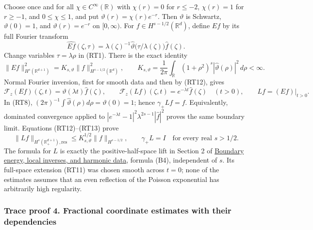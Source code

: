 \documentclass[
  11pt,
]{article}
\makeatletter
\let\ReaderOriginalAnchorStart\hyper@anchorstart
\let\ReaderOriginalAnchorEnd\hyper@anchorend
\let\ReaderPendingAliases\@empty
\def\ReaderArmAliases#1{\gdef\ReaderPendingAliases{#1}}
\def\hyper@anchorstart#1{\ReaderIfNativeAnchorTF{#1}{\ReaderPendingAliases\global\let\ReaderPendingAliases\@empty}{}\ReaderOriginalAnchorStart{#1}}
\makeatother
\begin{document}
Choose once and for all \(\chi\in C^\infty(\mathbb R)\) with
\(\chi(r)=0\) for \(r\leq-2\), \(\chi(r)=1\) for \(r\geq-1\), and
\(0\leq\chi\leq1\), and put \(\vartheta(r)=\chi(r)e^{-r}\). Then
\(\vartheta\) is Schwartz, \(\vartheta(0)=1\), and
\(\vartheta(r)=e^{-r}\) on \([0,\infty)\). For
\(f\in H^{s-1/2}(\mathbb R^d)\), define \(E f\) by its full Fourier
transform \[
 \widehat{E f}(\zeta,\tau)
 =\lambda(\zeta)^{-1}\widehat\vartheta\bigl(\tau/\lambda(\zeta)\bigr)
       \widehat f(\zeta).
 \tag{RT11}
\] Change variables \(\tau=\lambda\rho\) in (RT1). There is the exact
identity \[
 \|Ef\|_{H^s(\mathbb R^{d+1})}^2
 =K_{s,\vartheta}\|f\|_{H^{s-1/2}(\mathbb R^d)}^2,
 \qquad
 K_{s,\vartheta}=\frac1{2\pi}\int_{\mathbb R}(1+\rho^2)^s|\widehat\vartheta(\rho)|^2\,d\rho<\infty.
 \tag{RT12}
\] Normal Fourier inversion, first for smooth data and then by (RT12),
gives \[
 \mathcal F_z(Ef)(\zeta,t)=\vartheta(\lambda t)\widehat f(\zeta),
 \qquad
 \mathcal F_z(Lf)(\zeta,t)=e^{-\lambda t}\widehat f(\zeta)
 \quad(t>0),\qquad Lf=(Ef)|_{t>0}.
 \tag{RT13}
\] In (RT8),
\((2\pi)^{-1}\int\widehat\vartheta(\rho)d\rho=\vartheta(0)=1\); hence
\(\gamma_+Lf=f\). Equivalently, dominated convergence applied to
\(|e^{-\lambda t}-1|^2\lambda^{2s-1}|\widehat f|^2\) proves the same
boundary limit. Equations (RT12)--(RT13) prove \[
 \|Lf\|_{H^s(\mathbb R^{d+1}_+),\mathrm{res}}
 \leq K_{s,\vartheta}^{1/2}\|f\|_{H^{s-1/2}},\qquad\gamma_+L=I
 \quad\text{for every real }s>1/2.
 \tag{RT14}
\] The formula for \(L\) is exactly the positive-half-space lift in
Section 2 of \href{second-order-boundary.pdf}{Boundary energy, local
inverses, and harmonic data}, formula (B4), independent of \(s\). Its
full-space extension (RT11) was chosen smooth across \(t=0\); none of
the estimates assumes that an even reflection of the Poisson exponential
has arbitrarily high regularity.

\ReaderArmAliases{\ReaderOriginalAnchorStart{trace-proof-4-fractional-coordinate-estimates-with-their-dependencies}\ReaderOriginalAnchorEnd\begingroup\expandafter\def\csname @currentHref\endcsname{trace-proof-4-fractional-coordinate-estimates-with-their-dependencies}\label{trace-proof-4-fractional-coordinate-estimates-with-their-dependencies}\endgroup\ReaderOriginalAnchorStart{trace-proof-4.-fractional-coordinate-estimates-with-their-dependencies}\ReaderOriginalAnchorEnd}
\subsubsection{Trace proof 4. Fractional coordinate estimates with their
dependencies}\label{trace-proof-4.-fractional-coordinate-estimates-with-their-dependencies}
\end{document}
